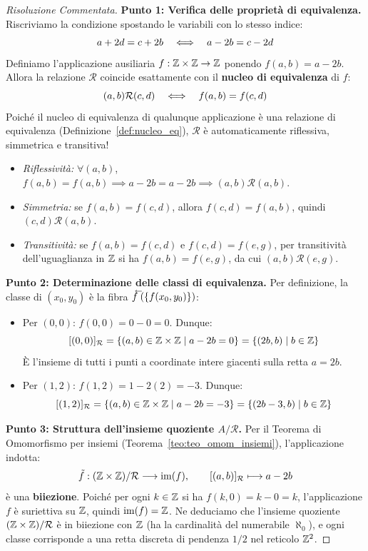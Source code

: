 \begin{proof}[Risoluzione Commentata]
\textbf{Punto 1: Verifica delle proprietà di equivalenza.}
Riscriviamo la condizione spostando le variabili con lo stesso indice:
\[
    a + 2d = c + 2b \quad \Longleftrightarrow \quad a - 2b = c - 2d
\]
Definiamo l'applicazione ausiliaria $f: \mathbb{Z} \times \mathbb{Z} \to \mathbb{Z}$ ponendo $f(a, b) = a - 2b$.
Allora la relazione $\mathcal{R}$ coincide esattamente con il \textbf{nucleo di equivalenza} di $f$:
\[
    (a, b) \mathcal{R} (c, d) \quad \Longleftrightarrow \quad f(a, b) = f(c, d)
\]
Poiché il nucleo di equivalenza di qualunque applicazione è una relazione di equivalenza (Definizione~\ref{def:nucleo_eq}), $\mathcal{R}$ è automaticamente riflessiva, simmetrica e transitiva!
\begin{itemize}
    \item \emph{Riflessività:} $\forall (a, b)$, $f(a, b) = f(a, b) \implies a - 2b = a - 2b \implies (a, b) \mathcal{R} (a, b)$.
    \item \emph{Simmetria:} se $f(a, b) = f(c, d)$, allora $f(c, d) = f(a, b)$, quindi $(c, d) \mathcal{R} (a, b)$.
    \item \emph{Transitività:} se $f(a, b) = f(c, d)$ e $f(c, d) = f(e, g)$, per transitività dell'uguaglianza in $\mathbb{Z}$ si ha $f(a, b) = f(e, g)$, da cui $(a, b) \mathcal{R} (e, g)$.
\end{itemize}

\textbf{Punto 2: Determinazione delle classi di equivalenza.}
Per definizione, la classe di $(x_0, y_0)$ è la fibra $\antivecf(\{f(x_0, y_0)\})$:
\begin{itemize}
    \item Per $(0, 0)$: $f(0, 0) = 0 - 0 = 0$. Dunque:
    \[
        [(0, 0)]_\mathcal{R} = \{(a, b) \in \mathbb{Z} \times \mathbb{Z} \mid a - 2b = 0\} = \{(2b, b) \mid b \in \mathbb{Z}\}
    \]
    È l'insieme di tutti i punti a coordinate intere giacenti sulla retta $a = 2b$.
    \item Per $(1, 2)$: $f(1, 2) = 1 - 2(2) = -3$. Dunque:
    \[
        [(1, 2)]_\mathcal{R} = \{(a, b) \in \mathbb{Z} \times \mathbb{Z} \mid a - 2b = -3\} = \{(2b - 3, b) \mid b \in \mathbb{Z}\}
    \]
\end{itemize}

\textbf{Punto 3: Struttura dell'insieme quoziente $A/\mathcal{R}$.}
Per il Teorema di Omomorfismo per insiemi (Teorema~\ref{teo:teo_omom_insiemi}), l'applicazione indotta:
\[
    \tilde{f}: (\mathbb{Z} \times \mathbb{Z})/\mathcal{R} \longrightarrow \operatorname{im}(f), \qquad [(a, b)]_\mathcal{R} \longmapsto a - 2b
\]
è una \textbf{biiezione}.
Poiché per ogni $k \in \mathbb{Z}$ si ha $f(k, 0) = k - 0 = k$, l'applicazione $f$ è suriettiva su $\mathbb{Z}$, quindi $\operatorname{im}(f) = \mathbb{Z}$.
Ne deduciamo che l'insieme quoziente $(\mathbb{Z} \times \mathbb{Z})/\mathcal{R}$ è in biiezione con $\mathbb{Z}$ (ha la cardinalità del numerabile $\aleph_0$), e ogni classe corrisponde a una retta discreta di pendenza $1/2$ nel reticolo $\mathbb{Z}^2$.
\end{proof}

